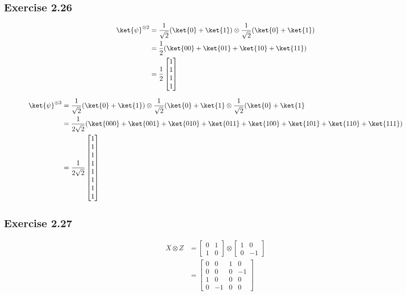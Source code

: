 \documentclass[a4paper,12pt]{article}
\begin{document}
\subsection*{Exercise 2.26}
\begin{align*}
	\ket{\psi}^{\otimes 2} &= \frac{1}{\sqrt{2}} (\ket{0} + \ket{1}) \otimes \frac{1}{\sqrt{2}} (\ket{0} + \ket{1})\\
		&= \frac{1}{2} (\ket{00}  + \ket{01} + \ket{10} + \ket{11}  )\\
		&= \frac{1}{2} \begin{bmatrix}
			1 \\
			1 \\
			1 \\
			1
		\end{bmatrix}
\end{align*}

\begin{align*}
	\ket{\psi}^{\otimes 3} &= \frac{1}{\sqrt{2}} (\ket{0} + \ket{1}) \otimes \frac{1}{\sqrt{2}} (\ket{0} + \ket{1}  \otimes \frac{1}{\sqrt{2}} (\ket{0} + \ket{1}\\
		&= \frac{1}{2\sqrt{2}} (\ket{000}  + \ket{001} + \ket{010} + \ket{011} +  \ket{100}  + \ket{101} + \ket{110} + \ket{111})\\
		&= \frac{1}{2\sqrt{2}} \begin{bmatrix}
			1 \\
			1 \\
			1 \\
			1 \\
			1 \\
			1 \\
			1 \\
			1
		\end{bmatrix}
\end{align*}


\subsection*{Exercise 2.27}
\begin{align*}
	X \otimes Z &= \begin{bmatrix}
		0 & 1 \\
		1 & 0
	\end{bmatrix}
	\otimes
	\begin{bmatrix}
		1 & 0 \\
		0 & -1
	\end{bmatrix} \\
	&= \begin{bmatrix}
		0 & 0 & 1 & 0 \\
		0 & 0 & 0 & -1 \\
		1 & 0 & 0 & 0 \\
		0 & -1 & 0 & 0
	\end{bmatrix}
\end{align*}
\end{document}
